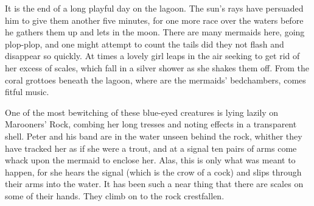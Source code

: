 

\begin{stagedir}
It is the end of a long playful day on the lagoon.
The sun's rays have persuaded him to give them another five minutes,
for one more race over the waters before he gathers them up and lets in the moon.
There are many mermaids here, going plop-plop,
and one might attempt to count the tails did they not flash and disappear so quickly.
At times a lovely girl leaps in the air seeking to get rid of her excess of scales,
which fall in a silver shower as she shakes them off.
From the coral grottoes beneath the lagoon, where are the mermaids' bedchambers, comes fitful music.

One of the most bewitching of these blue-eyed creatures is lying lazily on Marooners' Rock,
combing her long tresses and noting effects in a transparent shell.
Peter and his band are in the water unseen behind the rock,
whither they have tracked her as if she were a trout,
and at a signal ten pairs of arms come whack upon the mermaid to enclose her.
Alas, this is only what was meant to happen, for she hears the signal
(which is the crow of a cock)
and slips through their arms into the water.
It has been such a near thing that there are scales on some of their hands.
They climb on to the rock crestfallen.
\end{stagedir}


